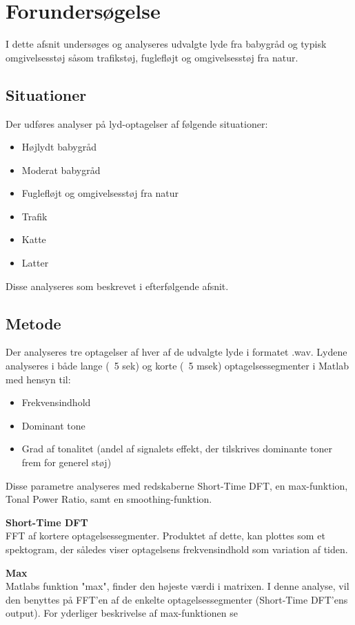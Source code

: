 \section{Forundersøgelse}

I dette afsnit undersøges og analyseres udvalgte lyde fra babygråd og typisk omgivelsesstøj såsom trafikstøj, fuglefløjt og omgivelsesstøj fra natur.

\subsection*{Situationer}
Der udføres analyser på lyd-optagelser af følgende situationer:
\begin{itemize}
	\item Højlydt babygråd
	\item Moderat babygråd
	\item Fuglefløjt og omgivelsesstøj fra natur
	\item Trafik
	\item Katte
	\item Latter 
\end{itemize} 
Disse analyseres som beskrevet i efterfølgende afsnit.

\subsection*{Metode}
Der analyseres tre optagelser af hver af de udvalgte lyde i formatet .wav. Lydene analyseres i både lange (~5 sek) og korte (~5 msek) optagelsessegmenter i Matlab med hensyn til:
\begin{itemize}
	\item Frekvensindhold
	\item Dominant tone
	\item Grad af tonalitet (andel af signalets effekt, der tilskrives dominante toner frem for generel støj) 
\end{itemize} 

Disse parametre analyseres med redskaberne Short-Time DFT, en max-funktion, Tonal Power Ratio, samt en smoothing-funktion.

\textbf{Short-Time DFT} \\
FFT af kortere optagelsessegmenter. Produktet af dette, kan plottes som et spektogram, der således viser optagelsens frekvensindhold som variation af tiden.

\textbf{Max} \\
Matlabs funktion "max", finder den højeste værdi i matrixen. I denne analyse, vil den benyttes på FFT'en af de enkelte optagelsessegmenter (Short-Time DFT'ens output). For yderliger beskrivelse af max-funktionen se \citep{website:max}

